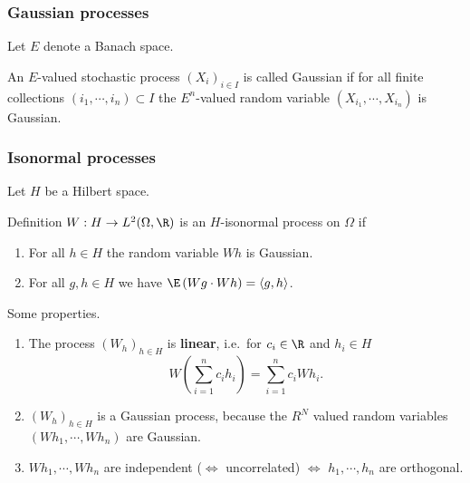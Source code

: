 \begin{frame}
    \frametitle{Gaussian processes}
    
    Let $E$ denote a Banach space.

    \begin{definition}
        An $E$-valued stochastic process $(X_i)_{i\in I}$ is called Gaussian if 
        for all finite collections $(i_1, \cdots, i_n) \subset I$ the $E^n$-valued 
        random variable $(X_{i_1}, \cdots, X_{i_n})$ is Gaussian. 
    \end{definition}

\end{frame}


\begin{frame}
    \frametitle{Isonormal processes}
    
    Let $H$ be a Hilbert space. 

    \begin{block}{Definition }
        $W: H \to L^2(\Omega, \R)$ is an $H$-isonormal process on $\Omega$ if
        \begin{enumerate}
            \item For all $h\in H$ the random variable $Wh$ is Gaussian. 
            \item For all $g,h \in H$ we have $\E \left( W g \cdot W h \right)
                = \langle g,h \rangle$. 
        \end{enumerate}
    \end{block}

    Some properties.
    \begin{enumerate}
        \item The process $(W_h)_{h \in H}$ is \textbf{linear}, i.e.\ 
            for $c_i \in \R$ and $h_i \in H$ 
            \begin{equation*}
                W \left( \sum_{i=1}^{n} c_{i} h_{i} \right) = 
                \sum_{i=1}^{n} c_i W h_i.
            \end{equation*}
        \item $(W_h)_{h \in H}$ is a Gaussian process, because the $R^{N}$ 
            valued random variables $(W h_1, \cdots ,W h_n)$ are Gaussian. 
        \item $W h_1, \cdots , W h_n$ are independent ($\iff$ uncorrelated)
            $\iff$ $h_1, \cdots , h_n$ are orthogonal.
    \end{enumerate}
\end{frame}



